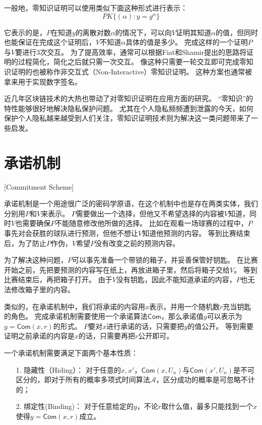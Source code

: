 一般地，零知识证明可以使用类似下面这种形式进行表示\cite{camenisch1997efficient}：
\begin{equation}
PK\{(\alpha):y=g^\alpha\}
\end{equation}

它表示的是，$P$在知道$y$的离散对数$\alpha$的情况下，可以向$V$证明其知道$\alpha$的值，但同时也能保证在完成这个证明后，$V$不知道$\alpha$具体的值是多少。
完成这样的一个证明$P$与$V$要进行3次交互。
为了提高效率，通常可以根据Fiat和Shamir提出的思路\cite{fiat1986prove}将证明的过程简化，简化之后就只需一次交互。
像这种只需要一轮交互即可完成零知识证明的也被称作非交互式（Non-Interactive）零知识证明。
这种方案也通常被拿来用于实现数字签名。

近几年区块链技术的大热也带动了对零知识证明在应用方面的研究。
“零知识”的特性能够很好地解决隐私保护问题。
尤其在个人隐私频频遭到泄露的今天，如何保护个人隐私越来越受到人们关注，零知识证明技术则为解决这一类问题带来了一些启发。

\section{承诺机制}[Commitment Scheme]

承诺机制是一个用途很广泛的密码学原语，在这个机制中也是存在两类实体，我们分别用$P$和$V$来表示。
$P$需要做出一个选择，但他又不希望选择的内容被$V$知道，同时$V$也需要确保$P$不能随意修改他所做的选择。
比如在观看一场球赛的过程中，$P$事先对会获胜的球队进行预测，但他不想让$V$知道他预测的内容。
等到比赛结束后，为了防止$P$作伪，$V$希望$P$没有改变之前的预测内容。

为了解决这种问题，$P$可以事先准备一个带锁的箱子，并妥善保管好钥匙。
在比赛开始之前，先把要预测的内容写在纸上，再放进箱子里，然后将箱子交给$V$。
等到比赛结束后，再把箱子打开。
由于$V$没有钥匙，因此不能知道承诺的内容，$P$也无法修改箱子里的内容。

类似的，在承诺机制中，我们将承诺的内容用$x$表示，并用一个随机数$r$充当钥匙的角色。
完成承诺机制需要使用一个承诺算法$\mathsf{Com}$，那么承诺值$y$可以表示为$y=\mathsf{Com}(x,r)$的形式。
$P$要对$x$进行承诺的话，只需要把$y$的值公开。
等到需要证明之前承诺的内容是$x$的话，只需要再把$r$公开即可。

一个承诺机制需要满足下面两个基本性质：

\begin{itemize}
  \item[1.] 隐藏性（Hiding）： 对于任意的$x,x'$，$\mathsf{Com}(x,U_n)$与$\mathsf{Com}(x',U_n)$是不可区分的，即对于所有的概率多项式时间算法$\mathcal{A}$，区分成功的概率是可忽略不计的；
  \item[2.] 绑定性(Binding)： 对于任意给定的$y$，不论$r$取什么值，最多只能找到一个$x$使得$y=\mathsf{Com}(x,r)$成立。
\end{itemize}

